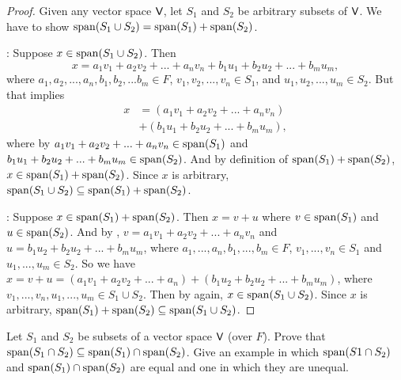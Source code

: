 \begin{proof}
Given any vector space \(\textsf{V}\), let \(S_1\) and \(S_2\) be arbitrary subsets of \(\textsf{V}\).
We have to show \(\operatorname{span}(S_1 \cup S_2) = \operatorname{span}(S_1) + \operatorname{span}(S_2)\).

:
Suppose \(x \in \operatorname{span}(S_1 \cup S_2)\).
Then
\[
    x = a_1 v_1 + a_2 v_2 + ... + a_n v_n + b_1 u_1 + b_2 u_2 + ... + b_m u_m,
\]
where \(a_1, a_2, ..., a_n, b_1, b_2, ... b_m \in F\), \(v_1, v_2, ..., v_n \in S_1\), and \(u_1, u_2, ..., u_m \in S_2\).
But that implies
\begin{align*}
    x & = (a_1 v_1 + a_2 v_2 + ... + a_n v_n) \\
      & + (b_1 u_1 + b_2 u_2 + ... + b_m u_m),
\end{align*}
where by  \(a_1 v_1 + a_2 v_2 + ... + a_n v_n \in \operatorname{span}(S_1)\) and \(b_1 u_1 + b_2 u_2 + ... + b_m u_m \in \operatorname{span}(S_2)\).
And by definition of \(\operatorname{span}(S_1) + \operatorname{span}(S_2)\), \(x \in \operatorname{span}(S_1) + \operatorname{span}(S_2)\).
Since \(x\) is arbitrary, \(\operatorname{span}(S_1 \cup S_2) \subseteq \operatorname{span}(S_1) + \operatorname{span}(S_2)\).

:
Suppose \(x \in \operatorname{span}(S_1) + \operatorname{span}(S_2)\).
Then \(x = v + u\) where \(v \in \operatorname{span}(S_1)\) and \(u \in \operatorname{span}(S_2)\).
And by , \(v = a_1 v_1 + a_2 v_2 + ... + a_n v_n\) and \(u = b_1 u_2 + b_2 u_2 + ... + b_m u_m\), where \(a_1, ..., a_n, b_1, ..., b_m \in F\), \(v_1, ..., v_n \in S_1\) and \(u_1, ..., u_m \in S_2\).
So we have \(x = v + u = (a_1 v_1 + a_2 v_2 + ... + a_n) + (b_1 u_2 + b_2 u_2 + ... + b_m u_m)\), where \(v_1, ..., v_n, u_1, ..., u_m \in S_1 \cup S_2\).
Then by  again, \(x \in \operatorname{span}(S_1 \cup S_2)\).
Since \(x\) is arbitrary, \(\operatorname{span}(S_1) + \operatorname{span}(S_2) \subseteq \operatorname{span}(S_1 \cup S_2)\).
\end{proof}

\begin{exercise} \label{exercise 1.4.15}
Let \(S_1\) and \(S_2\) be subsets of a vector space \(\textsf{V}\) (over \(F\)).
Prove that \(\operatorname{span}(S_1 \cap S_2) \subseteq \operatorname{span}(S_1) \cap \operatorname{span}(S_2)\).
Give an example in which \(\operatorname{span}(S1 \cap S_2)\) and
\(\operatorname{span}(S_1) \cap \operatorname{span}(S_2)\) are equal and one in which they are unequal.
\end{exercise}

